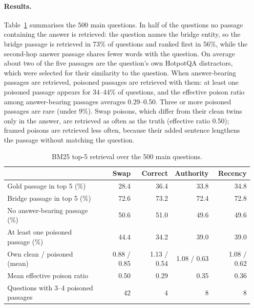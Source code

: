 \documentclass[11pt,a4paper]{report}
\begin{document}
\paragraph{Results.}
Table~\ref{tab:c4-rates} summarises the 500 main questions. In half of the
questions no passage containing the answer is retrieved: the question names the
bridge entity, so the bridge passage is retrieved in 73\% of questions and
ranked first in 56\%, while the second-hop answer passage shares fewer words
with the question. On average about two of the five passages are the question's
own HotpotQA distractors, which were selected for their similarity to the
question. When answer-bearing passages are retrieved, poisoned passages are
retrieved with them: at least one poisoned passage appears for 34--44\% of
questions, and the effective poison ratio among answer-bearing passages averages
0.29--0.50. Three or more poisoned passages are rare (under 9\%). Swap poisons,
which differ from their clean twins only in the answer, are retrieved as often
as the truth (effective ratio 0.50); framed poisons are retrieved less often,
because their added sentence lengthens the passage without matching the
question.

\begin{table}[h]
\centering\small
\begin{tabular}{@{}lrrrr@{}}
\toprule
 & Swap & Correct & Authority & Recency \\
\midrule
Gold passage in top 5 (\%)            & 28.4 & 36.4 & 33.8 & 34.8 \\
Bridge passage in top 5 (\%)          & 72.6 & 73.2 & 72.4 & 72.8 \\
No answer-bearing passage (\%)        & 50.6 & 51.0 & 49.6 & 49.6 \\
At least one poisoned passage (\%)    & 44.4 & 34.2 & 39.0 & 39.0 \\
Own clean / poisoned (mean)           & 0.88 / 0.85 & 1.13 / 0.54 & 1.08 / 0.63 & 1.08 / 0.62 \\
Mean effective poison ratio           & 0.50 & 0.29 & 0.35 & 0.36 \\
Questions with 3--4 poisoned passages & 42 & 4 & 8 & 8 \\
\bottomrule
\end{tabular}
\caption{BM25 top-5 retrieval over the 500 main questions.}
\label{tab:c4-rates}
\end{table}
\end{document}
